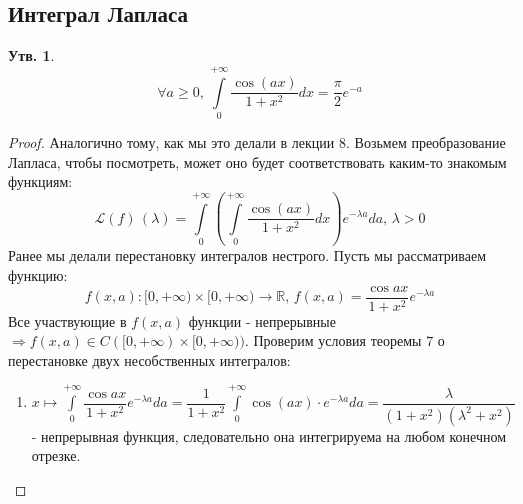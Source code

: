 \documentclass[12pt]{article}
\newcommand{\MR}{\mathbb{R}}
\newcommand{\ML}{\mathcal{L}}
\theoremstyle{definition}
\newtheorem{prop}{Утв.}
\newcommand{\ddint}[2]{\displaystyle\int\limits_{#1}^{#2}}
\begin{document}
\subsection*{Интеграл Лапласа}
\begin{prop}
	$$
		\forall a\geq 0 , \, \ddint{0}{+\infty}\dfrac{\cos{(ax)}}{1 + x^2}dx = \dfrac{\pi}{2}e^{-a}
	$$
\end{prop}
\begin{proof}
	Аналогично тому, как мы это делали в лекции $8$. Возьмем преобразование Лапласа, чтобы посмотреть, может оно будет соответствовать каким-то знакомым функциям:
	$$
		\ML(f)\, (\lambda) = \ddint{0}{+\infty}\left(\ddint{0}{+\infty}\dfrac{\cos{(ax)}}{1 + x^2}dx\right)e^{-\lambda a}da, \, \lambda > 0
	$$
	Ранее мы делали перестановку интегралов нестрого. Пусть мы рассматриваем функцию:
	$$
		f(x,a) \colon [0,+\infty)\times [0,+\infty) \to \MR, \, f(x,a) = \dfrac{\cos{ax}}{1+x^2}e^{-\lambda a}
	$$
	Все участвующие в $f(x,a)$ функции - непрерывные $\Rightarrow f(x,a) \in C([0,+\infty)\times [0,+\infty))$. Проверим условия теоремы $7$ о перестановке двух несобственных интегралов:
	\begin{enumerate}[label=(\arabic*)]
		\item $x \mapsto \ddint{0}{+\infty}\dfrac{\cos{ax}}{1 + x^2}e^{-\lambda a}da = \dfrac{1}{1 + x^2}\ddint{0}{+\infty}\cos{(ax)}{\cdot}e^{-\lambda a}da = \dfrac{\lambda}{(1+ x^2)(\lambda^2 + x^2)}$ - непрерывная функция, следовательно она интегрируема на любом конечном отрезке.
		

\end{enumerate}
\end{proof}
\end{document}
